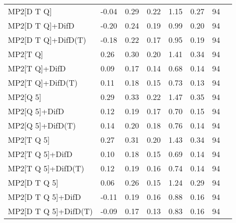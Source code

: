\begin{table}
\begin{tabular}{l l l l l l l l }
    MP2[D T Q] & -0.04 & 0.29 & 0.22 & 1.15 & 0.27 & 94 \\ 
    MP2[D T Q]+DifD & -0.20 & 0.24 & 0.19 & 0.99 & 0.20 & 94 \\ 
    MP2[D T Q]+DifD(T) & -0.18 & 0.22 & 0.17 & 0.95 & 0.19 & 94 \\ 
    MP2[T Q] & 0.26 & 0.30 & 0.20 & 1.41 & 0.34 & 94 \\ 
    MP2[T Q]+DifD & 0.09 & 0.17 & 0.14 & 0.68 & 0.14 & 94 \\ 
    MP2[T Q]+DifD(T) & 0.11 & 0.18 & 0.15 & 0.73 & 0.13 & 94 \\ 
    MP2[Q 5] & 0.29 & 0.33 & 0.22 & 1.47 & 0.35 & 94 \\ 
    MP2[Q 5]+DifD & 0.12 & 0.19 & 0.17 & 0.70 & 0.15 & 94 \\ 
    MP2[Q 5]+DifD(T) & 0.14 & 0.20 & 0.18 & 0.76 & 0.14 & 94 \\ 
    MP2[T Q 5] & 0.27 & 0.31 & 0.20 & 1.43 & 0.34 & 94 \\ 
    MP2[T Q 5]+DifD & 0.10 & 0.18 & 0.15 & 0.69 & 0.14 & 94 \\ 
    MP2[T Q 5]+DifD(T) & 0.12 & 0.19 & 0.16 & 0.74 & 0.14 & 94 \\ 
    MP2[D T Q 5] & 0.06 & 0.26 & 0.15 & 1.24 & 0.29 & 94 \\ 
    MP2[D T Q 5]+DifD & -0.11 & 0.19 & 0.16 & 0.88 & 0.16 & 94 \\ 
    MP2[D T Q 5]+DifD(T) & -0.09 & 0.17 & 0.13 & 0.83 & 0.16 & 94 \\ 
    \bottomrule
  \end{tabular}
\end{table}
